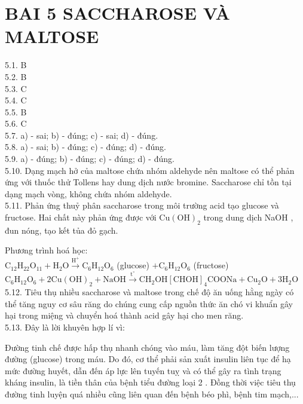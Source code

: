 \documentclass[10pt]{article}
\begin{document}
\section*{BAI 5 SACCHAROSE VÀ MALTOSE}
5.1. B\\
5.2. B\\
5.3. C\\
5.4. C\\
5.5. B\\
5.6. C\\
5.7. a) - sai; b) - đúng; c) - sai; d) - đúng.\\
5.8. a) - sai; b) - đúng; c) - đúng; d) - đúng.\\
5.9. a) - đúng; b) - đúng; c) - đúng; d) - đúng.\\
5.10. Dạng mạch hở của maltose chứa nhóm aldehyde nên maltose có thể phản ứng với thuốc thử Tollens hay dung dịch nước bromine. Saccharose chỉ tồn tại dạng mạch vòng, không chứa nhóm aldehyde.\\
5.11. Phản ứng thuỷ phân saccharose trong môi trường acid tạo glucose và fructose. Hai chất này phản ứng được với $\mathrm{Cu}(\mathrm{OH})_{2}$ trong dung dịch NaOH , đun nóng, tạo kết tủa đỏ gạch.

Phương trình hoá học:\\
$\mathrm{C}_{12} \mathrm{H}_{22} \mathrm{O}_{11}+\mathrm{H}_{2} \mathrm{O} \xrightarrow{\mathrm{H}^{+}} \mathrm{C}_{6} \mathrm{H}_{12} \mathrm{O}_{6}$ (glucose) $+\mathrm{C}_{6} \mathrm{H}_{12} \mathrm{O}_{6}$ (fructose)\\
$\mathrm{C}_{6} \mathrm{H}_{12} \mathrm{O}_{6}+2 \mathrm{Cu}(\mathrm{OH})_{2}+\mathrm{NaOH} \xrightarrow{\mathrm{t}^{\circ}} \mathrm{CH}_{2} \mathrm{OH}[\mathrm{CHOH}]_{4} \mathrm{COONa}+\mathrm{Cu}_{2} \mathrm{O}+3 \mathrm{H}_{2} \mathrm{O}$\\
5.12. Tiêu thụ nhiều saccharose và maltose trong chế độ ăn uống hằng ngày có thể tăng nguy cơ sâu răng do chúng cung cấp nguồn thức ăn chó vi khuẩn gây hại trong miệng và chuyển hoá thành acid gây hại cho men răng.\\
5.13. Đây là lời khuyên hợp lí vì:

Đường tinh chế được hấp thụ nhanh chóng vào máu, làm tăng đột biến lượng đường (glucose) trong máu. Do đó, cơ thể phải sản xuất insulin liên tục để hạ mức đường huyết, dẫn đến áp lực lên tuyến tuỵ và có thể gây ra tình trạng kháng insulin, là tiền thân của bệnh tiểu đường loại 2 . Đồng thời việc tiêu thụ đường tinh luyện quá nhiều cũng liên quan đến bệnh béo phì, bệnh tim mạch,...
\end{document}
